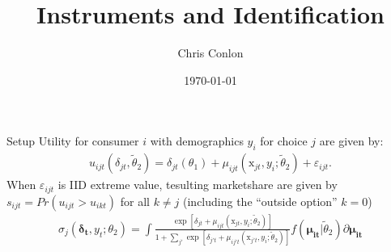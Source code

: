 \def\beamerclassoptions{[xcolor=pdftex,dvipsnames,table,mathserif,aspectratio=169]}


\usepackage[english]{babel}
\usepackage{pgf,pgfarrows,pgfnodes,pgfautomata,pgfheaps}
\usepackage{amsmath,amssymb,setspace,centernot}
\usepackage[latin1]{inputenc}
\usepackage[T1]{fontenc}
\usepackage{relsize}
\usepackage{pdfpages}
\usepackage[absolute,overlay]{textpos} 

\newenvironment{reference}[2]{%
  \begin{textblock*}{\textwidth}(#1,#2) 
      \footnotesize\it\bgroup\color{red!50!black}}{\egroup\end{textblock*}} 




\newcommand{\norm}[1]{\left\lVert#1\right\rVert}
\newcommand{\X}{\mathtt{X}}
\newcommand{\Y}{\mathtt{Y}}

\newcommand{\p}{\mathbb{P}}
\newcommand*\df{\mathop{}\!\mathrm{d}}
\newcommand{\del}{\partial}


\title{Instruments and Identification }
\author{Chris Conlon}
\date{\today}

\frame{\titlepage}


\begin{frame}{Setup}
Utility for consumer $i$ with demographics $y_i$ for choice $j$ are given by:
\begin{align*}
\label{eq:utility}
u_{ijt}(\delta_{jt},\widetilde{\theta}_2) =  \delta_{jt}(\theta_1)  + \mu_{ijt}(\textrm{x}_{jt}, y_i; \widetilde{\theta}_2) + \varepsilon_{ijt}.
\end{align*}
When $\varepsilon_{ijt}$ is IID extreme value, tesulting marketshare are given by $s_{ijt} = Pr(u_{ijt}> u_{ikt})$ for all $k\neq j$ (including the ``outside option'' $k=0$)
\begin{align*}
\sigma_j(\symbf{\delta_t},y_t;\theta_2)=\int \frac{\exp[\delta_{jt}+\mu_{ijt}(\textrm{x}_{jt}, y_i; \widetilde{\theta}_2)]}{1+\sum_{j'} \exp[\delta_{j't}+\mu_{ij't}(\textrm{x}_{j't}, y_i; \widetilde{\theta}_2)]}f(\symbf{\mu_{it}}| \widetilde{\theta}_2) \partial \symbf{\mu_{it}}
\end{align*}
\end{frame}


